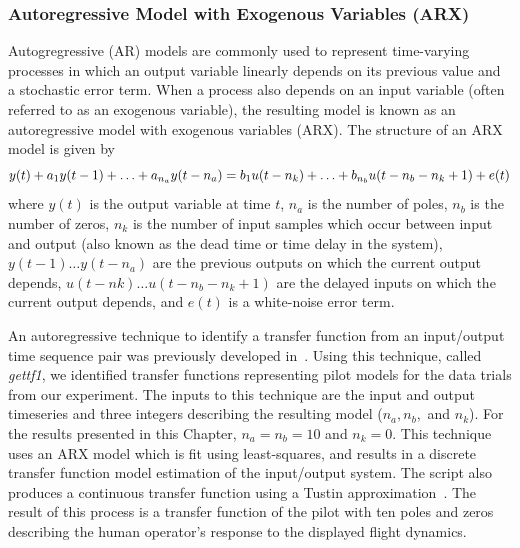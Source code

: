 \subsubsection{Autoregressive Model with Exogenous Variables (ARX)}
Autogregressive (AR) models are commonly used to represent time-varying processes in which an output variable linearly depends on its previous value and a stochastic error term.
When a process also depends on an input variable (often referred to as an exogenous variable), the resulting model is known as an autoregressive model with exogenous variables (ARX).
The structure of an ARX model is given by
\begin{equation}
    y(t) + a_1 y(t-1) + \ldots + a_{n_a} y(t - n_a) = \\
    b_1 u(t-n_k) + \ldots + b_{n_b} u(t-n_b - n_k+1) + e(t)
\end{equation}
where $y(t)$ is the output variable at time $t$, $n_a$ is the number of poles, $n_b$ is the number of zeros, $n_k$ is the number of input samples which occur between input and output (also known as the dead time or time delay in the system), $y(t-1) \ldots y(t-n_a)$ are the previous outputs on which the current output depends, $u(t-nk) \ldots u(t-n_b - n_k+1)$ are the delayed inputs on which the current output depends, and $e(t)$ is a white-noise error term.

An autoregressive technique to identify a transfer function from an input/output time sequence pair was previously developed in~\citet{hess_modeling_2002}.
Using this technique, called \textit{gettf1}, we identified transfer functions representing pilot models for the data trials from our experiment.
The inputs to this technique are the input and output timeseries and three integers describing the resulting model ($n_a, n_b,$ and $n_k$).
For the results presented in this Chapter, $n_a = n_b = 10$ and $n_k = 0$.
This technique uses an ARX model which is fit using least-squares, and results in a discrete transfer function model estimation of the input/output system.
The script also produces a continuous transfer function using a Tustin approximation~\cite{tustin1947method}.
The result of this process is a transfer function of the pilot with ten poles and zeros describing the human operator's response to the displayed flight dynamics.

